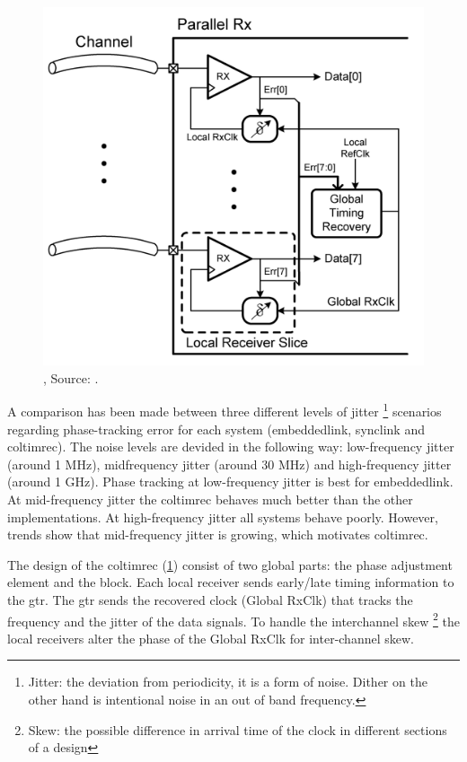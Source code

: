\begin{figure}	\centering
	
	\includegraphics[width=0.85\linewidth]{Figures/Rep1CombLink.png}
	\caption{, Source: \cite{agrawal20098}.} 
    \label{fig:rep1:coltimrec}
\end{figure}

A comparison has been made between three different levels of jitter \footnote{Jitter: the deviation from periodicity, it is a form of noise. Dither on the other hand is intentional noise in an out of band frequency.} scenarios regarding phase-tracking error for each system (\ac{embeddedlink}, \ac{synclink} and \ac{coltimrec}). 
The noise levels are devided in the following way: low-frequency jitter (around 1 MHz), midfrequency jitter (around 30 MHz) and high-frequency jitter (around 1 GHz).
Phase tracking at low-frequency jitter is best for \ac{embeddedlink}. 
At mid-frequency jitter the \ac{coltimrec} behaves much better than the other implementations. 
At high-frequency jitter all systems behave poorly.
However, trends show that mid-frequency jitter is growing, which motivates \ac{coltimrec}.

The design of the \ac{coltimrec} (\cref{fig:rep1:coltimrec}) consist of two global parts: the phase adjustment element and the  block.
Each local receiver sends early/late timing information to the \ac{gtr}.
The \ac{gtr} sends the recovered clock (Global RxClk) that tracks the frequency and the jitter of the data signals.
To handle the interchannel skew \footnote{Skew: the possible difference in arrival time of the clock in different sections of a design} the local receivers alter the phase of the Global RxClk for inter-channel skew.

